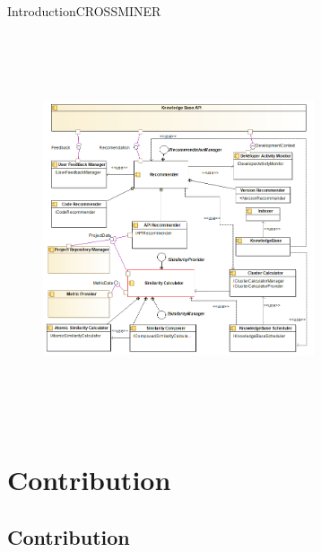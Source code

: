 \documentclass{beamer}
\begin{document}
\begin{frame}{Introduction}{CROSSMINER}
	\begin{figure}[!h]
	\includegraphics[width=8cm,height=11.5cm,keepaspectratio]{images/component.png}
	\centering
	\label{fig:ComponentDiagram}
	\end{figure}
\end{frame}

\section{Contribution}
\subsection{Contribution}
\end{document}
